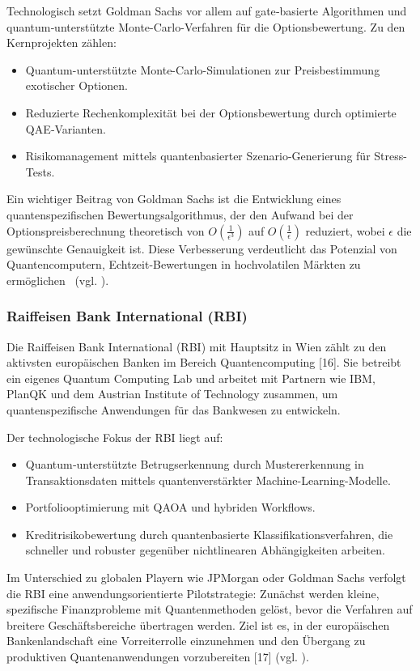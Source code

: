 Technologisch setzt Goldman Sachs vor allem auf gate‑basierte Algorithmen und quantum‑unterstützte Monte-Carlo-Verfahren für die Optionsbewertung.
Zu den Kernprojekten zählen:
\begin{itemize}
\item Quantum-unterstützte Monte-Carlo-Simulationen zur Preisbestimmung exotischer Optionen.
\item Reduzierte Rechenkomplexität bei der Optionsbewertung durch optimierte QAE‑Varianten.
\item Risikomanagement mittels quantenbasierter Szenario-Generierung für Stress-Tests.
\end{itemize}
Ein wichtiger Beitrag von Goldman Sachs ist die Entwicklung eines quantenspezifischen Bewertungsalgorithmus, 
der den Aufwand bei der Optionspreisberechnung theoretisch von 
$O\!\left(\frac{1}{\epsilon^3}\right)$ auf $O\!\left(\frac{1}{\epsilon}\right)$ 
reduziert, wobei $\epsilon$ die gewünschte Genauigkeit ist. 
Diese Verbesserung verdeutlicht das Potenzial von Quantencomputern, 
Echtzeit-Bewertungen in hochvolatilen Märkten zu ermöglichen~\cite{15} (vgl. \cite{brandhofer_benchmarking_20220}).


\subsubsection*{Raiffeisen Bank International (RBI)}
Die Raiffeisen Bank International (RBI) mit Hauptsitz in Wien zählt zu den aktivsten europäischen Banken im Bereich Quantencomputing [16].
Sie betreibt ein eigenes Quantum Computing Lab und arbeitet mit Partnern wie IBM, PlanQK und dem Austrian Institute of Technology zusammen, um quantenspezifische Anwendungen für das Bankwesen zu entwickeln.

Der technologische Fokus der RBI liegt auf:
\begin{itemize}
\item Quantum‑unterstützte Betrugserkennung durch Mustererkennung in Transaktionsdaten mittels quantenverstärkter Machine-Learning-Modelle.
\item Portfoliooptimierung mit QAOA und hybriden Workflows.
\item Kreditrisikobewertung durch quantenbasierte Klassifikationsverfahren, die schneller und robuster gegenüber nichtlinearen Abhängigkeiten arbeiten.
\end{itemize}

Im Unterschied zu globalen Playern wie JPMorgan oder Goldman Sachs verfolgt die RBI eine anwendungsorientierte Pilotstrategie:
Zunächst werden kleine, spezifische Finanzprobleme mit Quantenmethoden gelöst, bevor die Verfahren auf breitere Geschäftsbereiche übertragen werden. Ziel ist es, in der europäischen Bankenlandschaft eine Vorreiterrolle einzunehmen und den Übergang zu produktiven Quantenanwendungen vorzubereiten [17] (vgl. \cite{brandhofer_benchmarking_20220}).

